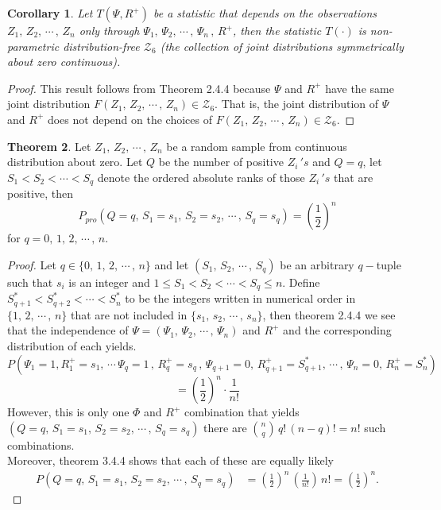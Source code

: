 \documentclass[12pt,a4paper]{report}
\theoremstyle{definition}
\newtheorem{thm}{Theorem}[section]
\theoremstyle{plain}
\newtheorem{coro}[thm]{Corollary}
\begin{document}
\begin{coro}
Let $T(\Psi, R^+)$ be a statistic that depends on the observations $Z_1, \, Z_2, \, \cdots\, , \, Z_n$ only through $\Psi_1, \, \Psi_2, \, \cdots\, , \, \Psi_n\, , \,   R^+$, then the statistic $T(\cdot)$ is non-parametric distribution-free $\mathscr{Z}_6$ (the collection of joint distributions symmetrically about zero continuous).
\end{coro}


\begin{proof}
This result follows from Theorem 2.4.4 because $\Psi$ and $R^+$ have the same joint distribution  $F(Z_1, \, Z_2, \, \cdots\, , \, Z_n)\in \mathscr{Z}_6$. That is, the joint distribution of $\Psi$ and $R^+$ does not depend on the choices of $F(Z_1, \, Z_2, \, \cdots\, , \, Z_n) \in \mathscr{Z}_6$.
\end{proof}


\begin{thm}
Let $Z_1, \, Z_2, \, \cdots\, , \, Z_n$ be a random sample from continuous distribution about zero. Let $Q$ be the number of positive $Z_i\, 's$  and $Q = q$, let $S_1 < S_2 < \cdots < S_q$ denote the ordered absolute ranks of those $Z_i\, 's$ that are positive, then
$$P_{pro}\left(Q = q, \, S_1 = s_1, \, S_2 = s_2, \, \cdots\, , \, S_q = s_q\right) = \left(\dfrac{1}{2}\right)^n$$
for $q = 0, \, 1,\, 2, \, \cdots\,, \, n.$
\end{thm}


\begin{proof}
Let $q\in \{0, \, 1, \, 2,\, \cdots\, , \, n\}$ and let $\left(S_1,\, S_2,  \, \cdots\, , \, S_q\right)$ be an arbitrary $q-$tuple such that $s_i$ is an integer and $1 \leq S_1 < S_2 < \cdots < S_q \leq n$. Define $S^*_{q + 1} < S^*_{q + 2} < \cdots < S^*_n$  to be the integers written in numerical order in $\{1,\, 2,\, \cdots\,,\, n\}$ that are not included in $\{s_1,\, s_2, \, \cdots\, ,\, s_n\}$, then theorem 2.4.4 we see that the independence of $\Psi = \left(\Psi_1, \, \Psi_2, \, \cdots\, , \, \Psi_n\right)$ and $R^+$ and the corresponding distribution of each yields.
$$P\left(\Psi_1 = 1, R^+_1 = s_1, \, \cdots\, \Psi_q = 1\, , \, R^+_q = s_q\, , \, \Psi_{q + 1} = 0,\,R^+_{q + 1} = S^*_{q + 1},\, \cdots\, , \, \Psi_n = 0,\, R^+_n  = S^*_n\right)$$ $$= \left(\frac{1}{2}\right)^n\cdot\frac{1}{n!}$$
However, this is only one $\Phi$ and $R^+$ combination that yields $\left(Q = q, \, S_1 = s_1, \, S_2 = s_2, \, \cdots\, , \, S_q = s_q\right)$
there are $\binom{n}{q}\,q!\, (n - q)! = n!$ such combinations.\\
Moreover, theorem 3.4.4 shows that each of these are equally likely 
\begin{align*}
P\left(Q = q, \, S_1 = s_1, \, S_2 = s_2, \, \cdots\, , \, S_q = s_q\right) & = \left(\frac{1}{2}\right)^n\, \left(\frac{1}{n!}\right)\, n! = \left(\frac{1}{2}\right)^n.
\end{align*}
\end{proof}
\end{document}

